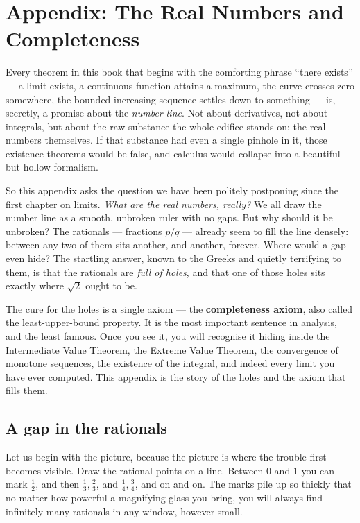 \chapter{Appendix: The Real Numbers and Completeness}

Every theorem in this book that begins with the comforting phrase ``there exists'' --- a
limit exists, a continuous function attains a maximum, the curve crosses zero somewhere,
the bounded increasing sequence settles down to something --- is, secretly, a promise
about the \emph{number line}. Not about derivatives, not about integrals, but about the
raw substance the whole edifice stands on: the real numbers themselves. If that substance
had even a single pinhole in it, those existence theorems would be false, and calculus
would collapse into a beautiful but hollow formalism.

So this appendix asks the question we have been politely postponing since the first
chapter on limits. \emph{What are the real numbers, really?} We all draw the number line
as a smooth, unbroken ruler with no gaps. But why should it be unbroken? The rationals
--- fractions $p/q$ --- already seem to fill the line densely: between any two of them
sits another, and another, forever. Where would a gap even hide? The startling answer,
known to the Greeks and quietly terrifying to them, is that the rationals are \emph{full
of holes}, and that one of those holes sits exactly where $\sqrt{2}$ ought to be.

The cure for the holes is a single axiom --- the \textbf{completeness axiom}, also called
the least-upper-bound property. It is the most important sentence in analysis, and the
least famous. Once you see it, you will recognise it hiding inside the Intermediate Value
Theorem, the Extreme Value Theorem, the convergence of monotone sequences, the existence
of the integral, and indeed every limit you have ever computed. This appendix is the
story of the holes and the axiom that fills them.

\chapterline

\section{A gap in the rationals}
\label{ch41:gap}

Let us begin with the picture, because the picture is where the trouble first becomes
visible. Draw the rational points on a line. Between $0$ and $1$ you can mark
$\tfrac12$, and then $\tfrac13, \tfrac23$, and $\tfrac14,\tfrac34$, and on and on. The
marks pile up so thickly that no matter how powerful a magnifying glass you bring, you
will always find infinitely many rationals in any window, however small.

